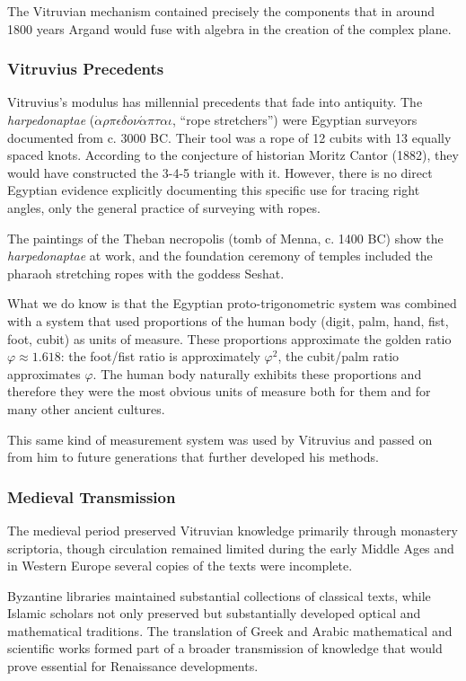 The Vitruvian mechanism contained precisely the components that in around 1800 years Argand would fuse with algebra in the creation of the complex plane.

\subsubsection{Vitruvius Precedents}

Vitruvius's modulus has millennial precedents that fade into antiquity. The \textit{harpedonaptae} ($\dot{\alpha}\rho\pi\epsilon\delta o\nu\acute{\alpha}\pi\tau\alpha\iota$, ``rope stretchers'') were Egyptian surveyors documented from c. 3000 BC. Their tool was a rope of 12 cubits with 13 equally spaced knots. According to the conjecture of historian Moritz Cantor (1882), they would have constructed the 3-4-5 triangle with it. However, there is no direct Egyptian evidence explicitly documenting this specific use for tracing right angles, only the general practice of surveying with ropes.

The paintings of the Theban necropolis (tomb of Menna, c. 1400 BC) show the \textit{harpedonaptae} at work, and the foundation ceremony of temples included the pharaoh stretching ropes with the goddess Seshat.

What we do know is that the Egyptian proto-trigonometric system was combined with a system that used proportions of the human body (digit, palm, hand, fist, foot, cubit) as units of measure. These proportions approximate the golden ratio $\varphi \approx 1.618$: the foot/fist ratio is approximately $\varphi^2$, the cubit/palm ratio approximates $\varphi$. The human body naturally exhibits these proportions and therefore they were the most obvious units of measure both for them and for many other ancient cultures.

This same kind of measurement system was used by Vitruvius and passed on from him to future generations that further developed his methods.

\subsubsection{Medieval Transmission}

The medieval period preserved Vitruvian knowledge primarily through monastery scriptoria, though circulation remained limited during the early Middle Ages and in Western Europe several copies of the texts were incomplete.

Byzantine libraries maintained substantial collections of classical texts, while Islamic scholars not only preserved but substantially developed optical and mathematical traditions. The translation of Greek and Arabic mathematical and scientific works formed part of a broader transmission of knowledge that would prove essential for Renaissance developments.

